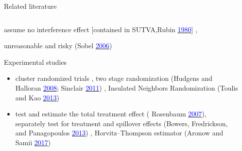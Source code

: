 \documentclass[notes,11pt, aspectratio=169]{beamer}
\begin{document}
\begin{frame}{Related literature}
\begin{columns}[T] %
\begin{column}{0.95\textwidth}
  \begin{wideitemize}
  \item assume no interference effect  [contained in SUTVA,Rubin \href{https://www.jstor.org/stable/2287653}{\textcolor{blue}{ 1980}}] ,   \item unreasonable and risky (Sobel \href{https://www.tandfonline.com/doi/abs/10.1198/016214506000000636}{\textcolor{blue}{2006}})
  \item Experimental studies 
  \begin{itemize}
  \vspace{10pt}
      \item cluster randomized trials , two stage randomization (Hudgens and Halloran \href{https://www.ncbi.nlm.nih.gov/pmc/articles/PMC2600548/}{\textcolor{blue}{2008}}; Sinclair \href{https://www.cambridge.org/core/books/abs/cambridge-handbook-of-experimental-political-science/design-and-analysis-of-experiments-in-multilevel-populations/5A74D87743BB688894BB8002A837C402}{\textcolor{blue}{2011}}) , Insulated Neighbors Randomization (Toulis and Kao \href{https://proceedings.mlr.press/v28/toulis13.html}{\textcolor{blue}{2013}}) 
      \vspace{10pt}
      \item test and estimate the total treatment effect ( Rosenbaum \href{https://www.tandfonline.com/doi/abs/10.1198/016214506000001112?journalCode=uasa20}{\textcolor{blue}{2007}}), separately test for treatment and spillover effects (Bowers, Fredrickson, and Panagopoulos \href{https://www.cambridge.org/core/journals/political-analysis/article/abs/reasoning-about-interference-between-units-a-general-framework/0E2410C1A5666EE5ACA4CBE29AFFFAE7}{\textcolor{blue}{2013}}) ,  Horvitz–Thompson estimator (Aronow and Samii \href{https://arxiv.org/abs/1305.6156}{\textcolor{blue}{2017}})
  \end{itemize} 
  \end{wideitemize}
\end{column}%
\hfill%
\begin{column}{.38\textwidth}
\end{column}%
\end{columns}
\end{frame}
\end{document}
